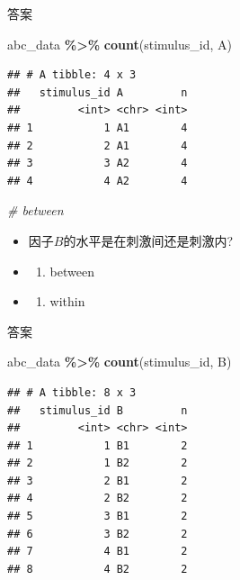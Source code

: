 \documentclass[
]{book}
\newenvironment{Shaded}{\begin{snugshade}}{\end{snugshade}}
\newcommand{\CommentTok}[1]{\textcolor[rgb]{0.56,0.35,0.01}{\textit{#1}}}
\newcommand{\FunctionTok}[1]{\textcolor[rgb]{0.13,0.29,0.53}{\textbf{#1}}}
\newcommand{\NormalTok}[1]{#1}
\newcommand{\SpecialCharTok}[1]{\textcolor[rgb]{0.81,0.36,0.00}{\textbf{#1}}}
\providecommand{\tightlist}{%
  \setlength{\itemsep}{0pt}\setlength{\parskip}{0pt}}
\begin{document}
答案

\begin{Shaded}
\begin{Highlighting}[]
\NormalTok{abc\_data }\SpecialCharTok{\%\textgreater{}\%}
  \FunctionTok{count}\NormalTok{(stimulus\_id, A)}
\end{Highlighting}
\end{Shaded}

\begin{verbatim}
## # A tibble: 4 x 3
##   stimulus_id A         n
##         <int> <chr> <int>
## 1           1 A1        4
## 2           2 A1        4
## 3           3 A2        4
## 4           4 A2        4
\end{verbatim}

\begin{Shaded}
\begin{Highlighting}[]
\CommentTok{\# between}
\end{Highlighting}
\end{Shaded}

\begin{itemize}
\item
  因子\(B\)的水平是在刺激间还是刺激内?
\item
  \begin{enumerate}
  \def\labelenumi{(\Alph{enumi})}
  \tightlist
  \item
    between\\
  \end{enumerate}
\item
  \begin{enumerate}
  \def\labelenumi{(\Alph{enumi})}
  \setcounter{enumi}{1}
  \tightlist
  \item
    within
  \end{enumerate}
\end{itemize}

答案

\begin{Shaded}
\begin{Highlighting}[]
\NormalTok{abc\_data }\SpecialCharTok{\%\textgreater{}\%}
  \FunctionTok{count}\NormalTok{(stimulus\_id, B)}
\end{Highlighting}
\end{Shaded}

\begin{verbatim}
## # A tibble: 8 x 3
##   stimulus_id B         n
##         <int> <chr> <int>
## 1           1 B1        2
## 2           1 B2        2
## 3           2 B1        2
## 4           2 B2        2
## 5           3 B1        2
## 6           3 B2        2
## 7           4 B1        2
## 8           4 B2        2
\end{verbatim}
\end{document}

